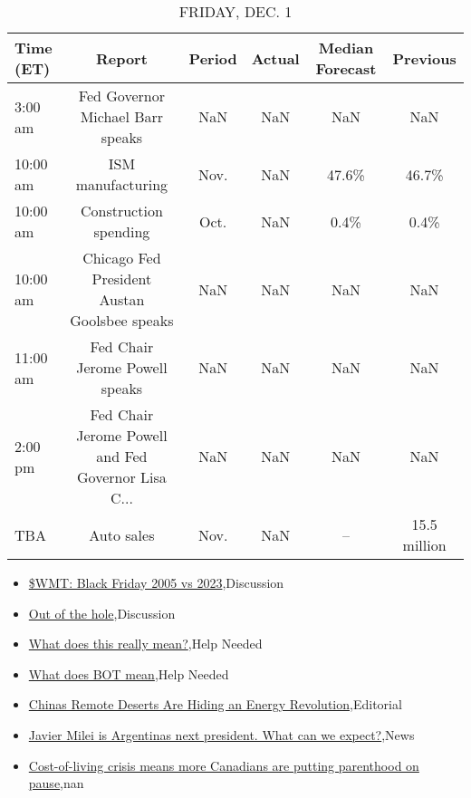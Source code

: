 \documentclass{article}%
\begin{document}
\begin{table}[htbp]%
\caption{FRIDAY, DEC. 1}%
\centering%
\begin{adjustbox}{width=1\textwidth}%
\begin{tabular}{lccccc}
\toprule
Time (ET) &                                             Report & Period & Actual & Median Forecast &     Previous \\
\midrule
  3:00 am &                   Fed Governor Michael Barr speaks &    NaN &    NaN &             NaN &          NaN \\
 10:00 am &                                  ISM manufacturing &   Nov. &    NaN &           47.6\% &        46.7\% \\
 10:00 am &                              Construction spending &   Oct. &    NaN &            0.4\% &         0.4\% \\
 10:00 am &       Chicago Fed President Austan Goolsbee speaks &    NaN &    NaN &             NaN &          NaN \\
 11:00 am &                     Fed Chair Jerome Powell speaks &    NaN &    NaN &             NaN &          NaN \\
  2:00 pm & Fed Chair Jerome Powell and Fed Governor Lisa C... &    NaN &    NaN &             NaN &          NaN \\
      TBA &                                         Auto sales &   Nov. &    NaN &              -- & 15.5 million \\
\bottomrule
\end{tabular}
%
\end{adjustbox}%
\end{table}

%
\begin{itemize}%
\item%
\href{https://reddit.com/r/StockMarket/comments/18416je/wmt\_black\_friday\_2005\_vs\_2023/}{\$WMT: Black Friday 2005 vs 2023},Discussion%
\item%
\href{https://reddit.com/r/StockMarket/comments/183u2yz/out\_of\_the\_hole/}{Out of the hole},Discussion%
\item%
\href{https://reddit.com/r/StockMarket/comments/1835v3e/what\_does\_this\_really\_mean/}{What does this really mean?},Help Needed%
\item%
\href{https://reddit.com/r/StockMarket/comments/182x69a/what\_does\_bot\_mean/}{What does BOT mean},Help Needed%
\item%
\href{https://reddit.com/r/Economics/comments/184yksi/chinas\_remote\_deserts\_are\_hiding\_an\_energy/}{Chinas Remote Deserts Are Hiding an Energy Revolution},Editorial%
\item%
\href{https://reddit.com/r/Economics/comments/184k7yi/javier\_milei\_is\_argentinas\_next\_president\_what/}{Javier Milei is Argentinas next president. What can we expect?},News%
\item%
\href{https://reddit.com/r/Economics/comments/184jui2/costofliving\_crisis\_means\_more\_canadians\_are/}{Cost-of-living crisis means more Canadians are putting parenthood on pause},nan%
\end{itemize}%
\end{document}
